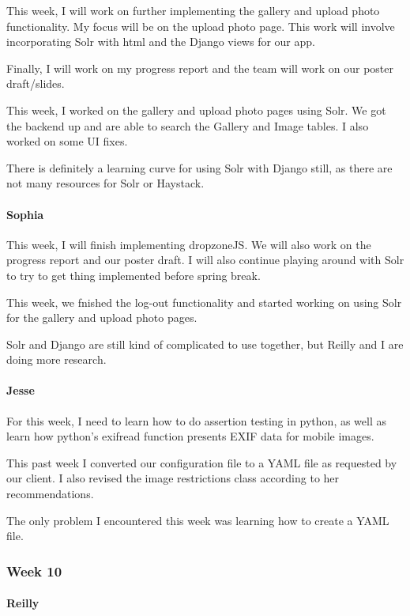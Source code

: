 \documentclass[onecolumn, draftclsnofoot,10pt, compsoc]{IEEEtran}
\begin{document}
\begin{flushleft}
This week, I will work on further implementing the gallery and upload photo functionality. My focus will be on the upload photo page. This work will involve incorporating Solr with html and the Django views for our app.
 
Finally, I will work on my progress report and the team will work on our poster draft/slides.
 
 
This week, I worked on the gallery and upload photo pages using Solr. We got the backend up and are able to search the Gallery and Image tables. I also worked on some UI fixes.
 
 
There is definitely a learning curve for using Solr with Django still, as there are not many resources for Solr or Haystack.
 
\paragraph{Sophia}
 
This week, I will finish implementing dropzoneJS. We will also work on the progress report and our poster draft. I will also continue playing around with Solr to try to get thing implemented before spring break.
 
 
This week, we fnished the log-out functionality and started working on using Solr for the gallery and upload photo pages.
 
 
Solr and Django are still kind of complicated to use together, but Reilly and I are doing more research.
 
\paragraph{Jesse}
 
For this week, I need to learn how to do assertion testing in python, as well as learn how python's exifread function presents EXIF data for mobile images.
 
 
This past week I converted our configuration file to a YAML file as requested by our client. I also revised the image restrictions class according to her recommendations.
 
 
The only problem I encountered this week was learning how to create a YAML file.
 
\subsubsection{Week 10}
\paragraph{Reilly}
 

\end{flushleft}
\end{document}

